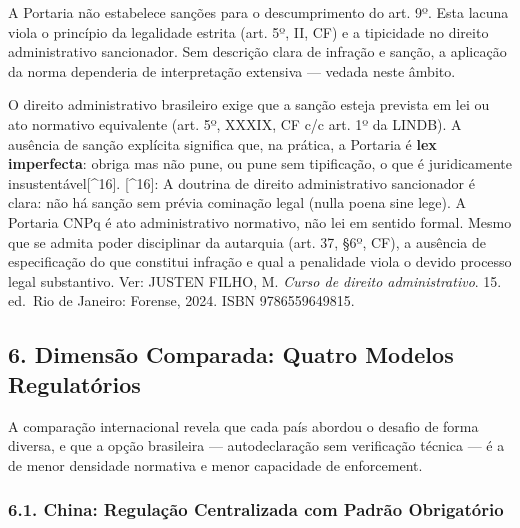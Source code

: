 \documentclass[
  12pt,
  a4paper,
  brazil
]{article}
\begin{document}
A Portaria não estabelece sanções para o descumprimento do art. 9º. Esta
lacuna viola o princípio da legalidade estrita (art. 5º, II, CF) e a
tipicidade no direito administrativo sancionador. Sem descrição clara de
infração e sanção, a aplicação da norma dependeria de interpretação
extensiva --- vedada neste âmbito.

O direito administrativo brasileiro exige que a sanção esteja prevista
em lei ou ato normativo equivalente (art. 5º, XXXIX, CF c/c art. 1º da
LINDB). A ausência de sanção explícita significa que, na prática, a
Portaria é \textbf{lex imperfecta}: obriga mas não pune, ou pune sem
tipificação, o que é juridicamente insustentável{[}\^{}16{]}.
{[}\^{}16{]}: A doutrina de direito administrativo sancionador é clara:
não há sanção sem prévia cominação legal (nulla poena sine lege). A
Portaria CNPq é ato administrativo normativo, não lei em sentido formal.
Mesmo que se admita poder disciplinar da autarquia (art. 37, §6º, CF), a
ausência de especificação do que constitui infração e qual a penalidade
viola o devido processo legal substantivo. Ver: JUSTEN FILHO, M.
\emph{Curso de direito administrativo}. 15. ed.~Rio de Janeiro: Forense,
2024. ISBN 9786559649815.

\subsection{6. Dimensão Comparada: Quatro Modelos
Regulatórios}\label{dimensuxe3o-comparada-quatro-modelos-regulatuxf3rios}

A comparação internacional revela que cada país abordou o desafio de
forma diversa, e que a opção brasileira --- autodeclaração sem
verificação técnica --- é a de menor densidade normativa e menor
capacidade de enforcement.

\subsubsection{6.1. China: Regulação Centralizada com Padrão
Obrigatório}\label{china-regulauxe7uxe3o-centralizada-com-padruxe3o-obrigatuxf3rio}
\end{document}
